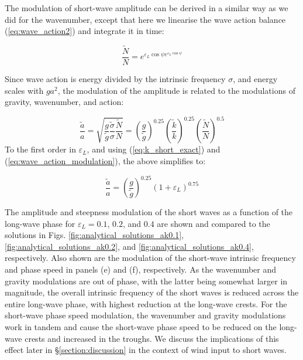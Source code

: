 \documentclass[lineno]{jfm}
\begin{document}
The modulation of short-wave amplitude can be derived in a similar way as we did
for the wavenumber, except that here we linearise the wave action balance
(\ref{eq:wave_action2}) and integrate it in time:

\begin{equation}
\label{eq:wave_action_modulation}
\frac{\widetilde{N}}{N} = e^{\varepsilon_L \cos{\psi} e^{\varepsilon_L \cos{\psi}}}
\end{equation}

Since wave action is energy divided by the intrinsic frequency $\sigma$,
and energy scales with $ga^2$, the modulation of the amplitude is related to the
modulations of gravity, wavenumber, and action:

\begin{equation}
\label{eq:wave_amplitude_modulation}
\dfrac{\widetilde{a}}{a} = \sqrt{
  \dfrac{g}{\widetilde{g}}
  \dfrac{\widetilde{\sigma}}{\sigma}
  \dfrac{\widetilde{N}}{N}}
=
  \left( \dfrac{g}{\widetilde{g}} \right)^{0.25}
  \left( \dfrac{\widetilde{k}}{k} \right)^{0.25}
  \left( \dfrac{\widetilde{N}}{N} \right)^{0.5}
\end{equation}
To the first order in $\varepsilon_L$, and using (\ref{eq:k_short_exact})
and (\ref{eq:wave_action_modulation}), the above simplifies to:

\begin{equation}
\label{eq:wave_amplitude_modulation_order1}
\dfrac{\widetilde{a}}{a} = 
  \left( \dfrac{g}{\widetilde{g}} \right)^{0.25}
  \left( 1 + \varepsilon_L \right)^{0.75}
\end{equation}

The amplitude and steepness modulation of the short waves as a function of the
long-wave phase for $\varepsilon_L = 0.1$, $0.2$, and $0.4$ are shown and compared
to the \citet{longuet1960changes} solutions in Figs.
\ref{fig:analytical_solutions_ak0.1}, \ref{fig:analytical_solutions_ak0.2},
and \ref{fig:analytical_solutions_ak0.4}, respectively.
Also shown are the modulation of the short-wave intrinsic frequency and phase
speed in panels (e) and (f), respectively.
As the wavenumber and gravity modulations are out of phase, with the latter
being somewhat larger in magnitude, the overall intrinsic frequency of the
short waves is reduced across the entire long-wave phase, with highest reduction
at the long-wave crests.
For the short-wave phase speed modulation, the wavenumber and gravity modulations
work in tandem and cause the short-wave phase speed to be reduced on the long-wave
crests and increased in the troughs.
We discuss the implications of this effect later in \S\ref{section:discussion}
in the context of wind input to short waves.
\end{document}
